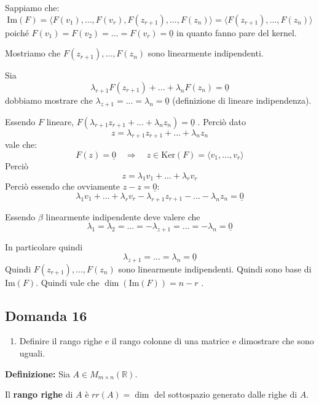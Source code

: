 \documentclass[
  a4paper,
]{article}
\providecommand{\tightlist}{%
  \setlength{\itemsep}{0pt}\setlength{\parskip}{0pt}}
\providecommand{\tightlist}{}
\begin{document}
Sappiamo che: \[
\text{Im}(F) = \langle F(v_1), \dots , F(v_r), F(z_{r+1}), ..., F(z_n) \rangle = \langle F(z_{r+1}), ..., F(z_n)\rangle
\]poiché \(F(v_1) = F(v_2) = \dots = F(v_r) = \underline{0}\) in quanto
fanno pare del kernel.

Mostriamo che \(F(z_{r+1}), ..., F(z_n)\) sono linearmente indipendenti.

Sia \[
\lambda_{r+1} F(z_{r+1})+ ...+ \lambda_{n}F(z_n) = \underline{0}
\] dobbiamo mostrare che
\(\lambda_{z+1} = ... = \lambda_n = \underline{0}\) (definizione di
lineare indipendenza).

Essendo \(F\) lineare,
\(F(\lambda_{r+1}z_{r+1} + ...+ \lambda_{n} z_n) = \underline{0}\) .
Perciò dato \[
z = \lambda_{r+1}z_{r+1} + ...+ \lambda_{n} z_n
\] vale che: \[
F(z) = \underline{0} \quad\Longrightarrow \quad z \in \text{Ker}(F) = \langle v_1, \dots,  v_r \rangle
\] Perciò \[
z = \lambda_1 v_1 + ... + \lambda_r v_r
\] Perciò essendo che ovviamente \(z - z = \underline{0}\): \[
\lambda_1 v_1 + ... + \lambda_r v_r - \lambda_{r+1}z_{r+1} - ...- \lambda_{n} z_n = \underline{0}
\]

Essendo \(\beta\) linearmente indipendente deve valere che \[
\lambda_1 = \lambda_2 = ... = -\lambda_{z+1} = ... = - \lambda_n = \underline{0}
\]

In particolare quindi \[
\lambda_{z+1} = ... = \lambda_n = \underline{0}
\] Quindi \(F(z_{r+1}), ..., F(z_n)\) sono linearmente indipendenti.
Quindi sono base di \(\text{Im}(F)\). Quindi vale che
\(\dim(\text{Im}(F)) = n - r\) .

\hypertarget{domanda-16}{%
\subsection{Domanda 16}\label{domanda-16}}

\begin{observationbox}[Domanda]
\begin{enumerate}
\def\labelenumi{\arabic{enumi}.}
\setcounter{enumi}{15}
\tightlist
\item
  Definire il rango righe e il rango colonne di una matrice e dimostrare
  che sono uguali.
\end{enumerate}
\end{observationbox}

\textbf{Definizione:} Sia \(A \in M_{m \times n}(\mathbb{R})\).

Il \textbf{rango righe} di \(A\) è \(rr(A) =\dim\) del sottospazio
generato dalle righe di \(A\).
\end{document}
